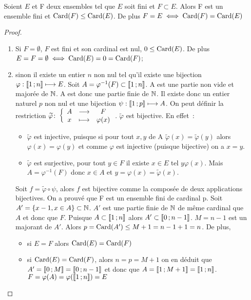 \begin{theo}\label{theo:partiesfinies}
  Soient $E$ et F deux ensembles tel que $E$ soit fini et $F\subset E$. Alors F est un ensemble fini et $\operatorname{Card}(F)\leq\operatorname{Card}(E)$. De plus $F=E \iff \operatorname{Card}(F)=\operatorname{Card}(E)$
\end{theo}
\begin{proof}
  \begin{enumerate}
  \item Si $F=\emptyset$, $F$ est fini et son cardinal est nul, $0\leq\operatorname{Card}(E)$. De plus $E=F=\emptyset \iff \operatorname{Card}(E)=0=\operatorname{Card}(F)$;
  \item sinon il existe un entier $n$ non nul tel qu'il existe une bijection $\varphi:\mathopen{\llbracket}1\mathclose{}\mathpunct{};n\mathclose{\rrbracket} \longmapsto E$. Soit $A=\varphi^{-1}(F) \subset\mathopen{\llbracket}1\mathclose{}\mathpunct{};n\mathclose{\rrbracket}$. A est une partie non vide et majorée de $\mathbb{N}$. A est donc une partie finie de $\mathbb{N}$. Il existe donc un entier naturel $p$ non nul et une bijection $\psi:\mathopen{\llbracket}1\mathclose{}\mathpunct{};p\mathclose{\rrbracket} \longmapsto A$. On peut définir la restriction $\widetilde{\varphi}\colon \left\{\begin{array}{ccc} A & \longrightarrow &F\\ x & \longmapsto & \varphi(x) \end{array} \right.$. $\widetilde{\varphi}$ est bijective. En effet~:
    \begin{itemize}
    \item $\widetilde{\varphi}$ est injective, puisque si pour tout $x,y$ de A $\widetilde{\varphi}(x)=\widetilde{\varphi}(y)$ alors $\varphi(x)=\varphi(y)$ et comme $\varphi$ est injective (puisque bijective) on a $x=y$.
    \item $\widetilde{\varphi}$ est surjective, pour tout $y\in F$ il existe $x\in E$ tel $y\varphi(x)$. Mais $A=\varphi^{-1}(F)$ donc $x\in A$ et $y=\varphi(x)=\widetilde{\varphi}(x)$.
    \end{itemize}
    Soit $f=\widetilde{\varphi}\circ \psi$, alors $f$ est bijective comme la composée de deux applications bijectives. On a prouvé que F est un ensemble fini de cardinal p. Soit $A'=\{x-1, x\in A\}\subset \mathbb{N}$. $A'$ est une partie finie de $\mathbb{N}$ de même cardinal que $A$ et donc que $F$. Puisque $A\subset\mathopen{\llbracket}1\mathclose{}\mathpunct{};n\mathclose{\rrbracket}$ alors $A'\subset\mathopen{\llbracket}0\mathclose{}\mathpunct{};n-1\mathclose{\rrbracket}$. $M=n-1$ est un majorant de $A'$. Alors $p=\operatorname{Card}(A')\leq M+1=n-1+1=n$. De plus, 
    \begin{itemize}
    \item si $E=F$ alors $\operatorname{Card}(E)=\operatorname{Card}(F)$
    \item si $\operatorname{Card}(E)=\operatorname{Card}(F)$, alors $n=p=M+1$ on en déduit que $A'=\mathopen{\llbracket}0\mathclose{}\mathpunct{};M\mathclose{\rrbracket} = \mathopen{\llbracket}0\mathclose{}\mathpunct{};n-1\mathclose{\rrbracket}$ et donc que $A=\mathopen{\llbracket}1\mathclose{}\mathpunct{};M+1\mathclose{\rrbracket} = \mathopen{\llbracket}1\mathclose{}\mathpunct{};n\mathclose{\rrbracket}$. $F=\varphi(A)=\varphi(\mathopen{\llbracket}1\mathclose{}\mathpunct{};n\mathclose{\rrbracket})=E$
    \end{itemize}
  \end{enumerate}
\end{proof}

